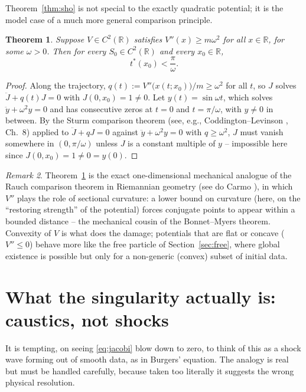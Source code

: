 \documentclass[11pt]{article}
\theoremstyle{plain}
\newtheorem{theorem}{Theorem}[section]
\theoremstyle{definition}
\theoremstyle{remark}
\newtheorem{remark}[theorem]{Remark}
\begin{document}
Theorem~\ref{thm:sho} is not special to the exactly quadratic potential; it is
the model case of a much more general comparison principle.

\begin{theorem}
\label{thm:sturm}
Suppose $V\in C^2(\mathbb{R})$ satisfies $V''(x)\ge m\omega^2$ for all
    $x\in\mathbb{R}$, for some $\omega>0$. Then for every $S_0\in
    C^2(\mathbb{R})$ and every $x_0\in\mathbb{R}$,
\[
t^\ast(x_0) < \frac{\pi}{\omega}.
\]
\end{theorem}

\begin{proof}
Along the trajectory, $q(t):=V''\big(x(t;x_0)\big)/m \ge \omega^2$ for all $t$,
    so $J$ solves $\ddot J + q(t)J=0$ with $J(0,x_0)=1\ne0$. Let
    $y(t)=\sin\omega t$, which solves $\ddot y+\omega^2y=0$ and has consecutive
    zeros at $t=0$ and $t=\pi/\omega$, with $y\ne0$ in between. By the Sturm
    comparison theorem (see, e.g., Coddington--Levinson
    \cite{CoddingtonLevinson}, Ch.~8) applied to $\ddot J+qJ=0$ against $\ddot
    y+\omega^2y=0$ with $q\ge\omega^2$, $J$ must vanish somewhere in
    $(0,\pi/\omega)$ unless $J$ is a constant multiple of $y$ -- impossible
    here since $J(0,x_0)=1\ne 0=y(0)$.
\end{proof}

\begin{remark}
Theorem~\ref{thm:sturm} is the exact one-dimensional mechanical analogue of the
    Rauch comparison theorem in Riemannian geometry (see do Carmo
    \cite{doCarmo}), in which $V''$ plays the role of sectional curvature: a
    lower bound on curvature (here, on the ``restoring strength'' of the
    potential) forces conjugate points to appear within a bounded distance --
    the mechanical cousin of the Bonnet--Myers theorem. Convexity of $V$ is
    what does the damage; potentials that are flat or concave ($V''\le0$)
    behave more like the free particle of Section~\ref{sec:free}, where global
    existence is possible but only for a non-generic (convex) subset of initial
    data.
\end{remark}

\section{What the singularity actually is: caustics, not shocks}
\label{sec:geometry}

It is tempting, on seeing \eqref{eq:jacobi} blow down to zero, to think of this
as a shock wave forming out of smooth data, as in Burgers' equation. The
analogy is real but must be handled carefully, because taken too literally it
suggests the wrong physical resolution.
\end{document}
